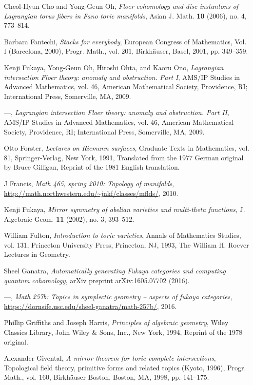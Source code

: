 \begin{description}[leftmargin=7.4em, labelwidth=6.8em, labelsep=0.6em,
                   font=\normalfont, itemsep=0.35em, parsep=0pt]
\item[{[CO06]}] Cheol-Hyun Cho and Yong-Geun Oh, \emph{Floer cohomology and disc instantons of Lagrangian torus fibers in Fano toric manifolds}, Asian J. Math. \textbf{10} (2006), no. 4, 773--814.
\item[{[Fan01]}] Barbara Fantechi, \emph{Stacks for everybody}, European Congress of Mathematics, Vol. I (Barcelona, 2000), Progr. Math., vol. 201, Birkh\"auser, Basel, 2001, pp. 349--359.
\item[{[FOOO09a]}] Kenji Fukaya, Yong-Geun Oh, Hiroshi Ohta, and Kaoru Ono, \emph{Lagrangian intersection Floer theory: anomaly and obstruction. Part I}, AMS/IP Studies in Advanced Mathematics, vol. 46, American Mathematical Society, Providence, RI; International Press, Somerville, MA, 2009.
\item[{[FOOO09b]}] ---, \emph{Lagrangian intersection Floer theory: anomaly and obstruction. Part II}, AMS/IP Studies in Advanced Mathematics, vol. 46, American Mathematical Society, Providence, RI; International Press, Somerville, MA, 2009.
\item[{[For91]}] Otto Forster, \emph{Lectures on Riemann surfaces}, Graduate Texts in Mathematics, vol. 81, Springer-Verlag, New York, 1991, Translated from the 1977 German original by Bruce Gilligan, Reprint of the 1981 English translation.
\item[{[Fra10]}] J Francis, \emph{Math 465, spring 2010: Topology of manifolds}, \url{http://math.northwestern.edu/~jnkf/classes/mflds/}, 2010.
\item[{[Fuk02]}] Kenji Fukaya, \emph{Mirror symmetry of abelian varieties and multi-theta functions}, J. Algebraic Geom. \textbf{11} (2002), no. 3, 393--512.
\item[{[Ful93]}] William Fulton, \emph{Introduction to toric varieties}, Annals of Mathematics Studies, vol. 131, Princeton University Press, Princeton, NJ, 1993, The William H. Roever Lectures in Geometry.
\item[{[Gan16a]}] Sheel Ganatra, \emph{Automatically generating Fukaya categories and computing quantum cohomology}, arXiv preprint arXiv:1605.07702 (2016).
\item[{[Gan16b]}] ---, \emph{Math 257b: Topics in symplectic geometry -- aspects of fukaya categories}, \url{https://dornsife.usc.edu/sheel-ganatra/math-257b/}, 2016.
\item[{[GH94]}] Phillip Griffiths and Joseph Harris, \emph{Principles of algebraic geometry}, Wiley Classics Library, John Wiley \& Sons, Inc., New York, 1994, Reprint of the 1978 original.
\item[{[Giv98]}] Alexander Givental, \emph{A mirror theorem for toric complete intersections}, Topological field theory, primitive forms and related topics (Kyoto, 1996), Progr. Math., vol. 160, Birkh\"auser Boston, Boston, MA, 1998, pp. 141--175.


\end{description}
